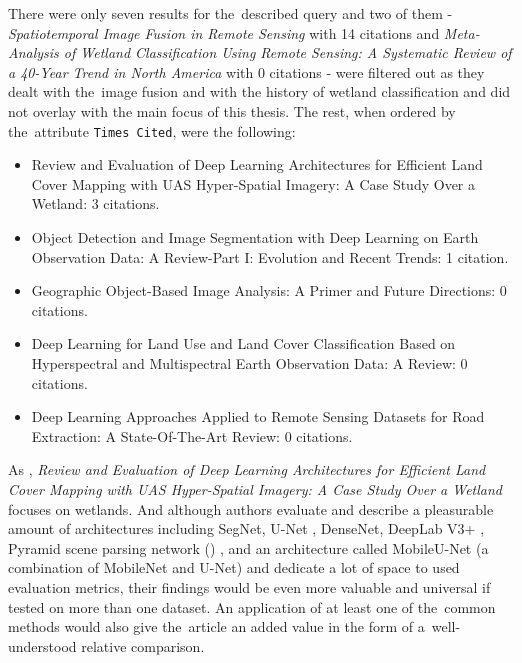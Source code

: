 \noindent There were only seven results for the~described query and two of them - \textit{Spatiotemporal Image Fusion in Remote Sensing} \cite{review-st-fusion} with 14 citations and \textit{Meta-Analysis of Wetland Classification Using Remote Sensing: A Systematic Review of a 40-Year Trend in North America} \cite{review-wetlands-40-years} with 0 citations - were filtered out as they dealt with the~image fusion and with the history of wetland classification and did not overlay with the main focus of this thesis. The rest, when ordered by the~attribute \verb|Times Cited|, were the following:

\begin{itemize}
	\item Review and Evaluation of Deep Learning Architectures for Efficient Land Cover Mapping with UAS Hyper-Spatial Imagery: A Case Study Over a Wetland: 3 citations. \cite{review-dl-wetlands}
	\item Object Detection and Image Segmentation with Deep Learning on Earth Observation Data: A Review-Part I: Evolution and Recent Trends: 1 citation. \cite{review-dl-eo}
	\item Geographic Object-Based Image Analysis: A Primer and Future Directions: 0 citations. \cite{geobia}
	\item Deep Learning for Land Use and Land Cover Classification Based on Hyperspectral and Multispectral Earth Observation Data: A Review: 0 citations. \cite{review-dl-lulc}
	\item Deep Learning Approaches Applied to Remote Sensing Datasets for Road Extraction: A State-Of-The-Art Review: 0 citations. \cite{review-dl-road-extraction}
\end{itemize}

As \cite{very-deep-cnn-lc}, \textit{Review and Evaluation of Deep Learning Architectures for Efficient Land Cover Mapping with UAS Hyper-Spatial Imagery: A Case Study Over a Wetland} focuses on wetlands. And although authors evaluate and describe a pleasurable amount of architectures including SegNet, U-Net \cite{u-net}, DenseNet, DeepLab V3+ \cite{deeplab}, Pyramid scene parsing network () \cite{pspnet}, and an architecture called MobileU-Net (a combination of MobileNet \cite{mobilenet} and U-Net) and dedicate a lot of space to used evaluation metrics, their findings would be even more valuable and universal if tested on more than one dataset. An application of at least one of the~common  methods would also give the~article an added value in the form of a~well-understood relative comparison.

